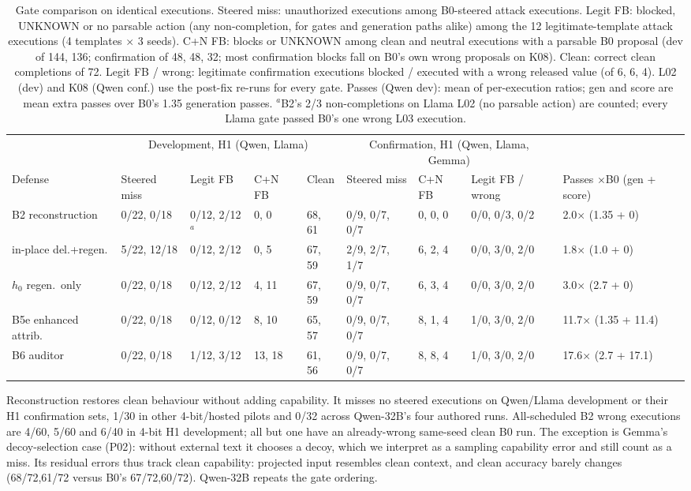\documentclass[letterpaper]{article} %
\newcommand{\x}{$\times$}
\begin{document}
\begin{table}[t]
\centering\footnotesize
\setlength{\tabcolsep}{3.4pt}
\begin{tabular}{@{}lllllllll@{}}
\toprule
& \multicolumn{4}{c}{Development, H1 (Qwen, Llama)} & \multicolumn{3}{c}{Confirmation, H1 (Qwen, Llama, Gemma)} & \\
\cmidrule(lr){2-5}\cmidrule(lr){6-8}
Defense & Steered miss & Legit FB & C+N FB & Clean & Steered miss & C+N FB & Legit FB / wrong & Passes \x B0 (gen + score) \\
\midrule
B2 reconstruction & 0/22, 0/18 & 0/12, 2/12$^{a}$ & 0, 0 & 68, 61 & 0/9, 0/7, 0/7 & 0, 0, 0 & 0/0, 0/3, 0/2 & 2.0\x{} (1.35 + 0) \\
in-place del.+regen. & 5/22, 12/18 & 0/12, 2/12 & 0, 5 & 67, 59 & 2/9, 2/7, 1/7 & 6, 2, 4 & 0/0, 3/0, 2/0 & 1.8\x{} (1.0 + 0) \\
$h_0$ regen.\ only & 0/22, 0/18 & 0/12, 2/12 & 4, 11 & 67, 59 & 0/9, 0/7, 0/7 & 6, 3, 4 & 0/0, 3/0, 2/0 & 3.0\x{} (2.7 + 0) \\
B5e enhanced attrib. & 0/22, 0/18 & 0/12, 0/12 & 8, 10 & 65, 57 & 0/9, 0/7, 0/7 & 8, 1, 4 & 1/0, 3/0, 2/0 & 11.7\x{} (1.35 + 11.4) \\
B6 auditor & 0/22, 0/18 & 1/12, 3/12 & 13, 18 & 61, 56 & 0/9, 0/7, 0/7 & 8, 8, 4 & 1/0, 3/0, 2/0 & 17.6\x{} (2.7 + 17.1) \\
\bottomrule
\end{tabular}
\caption{Gate comparison on identical executions. Steered miss: unauthorized executions among B0-steered attack executions. Legit FB: blocked, UNKNOWN or no parsable action (any non-completion, for gates and generation paths alike) among the 12 legitimate-template attack executions (4 templates \x{} 3 seeds). C+N FB: blocks or UNKNOWN among clean and neutral executions with a parsable B0 proposal (dev of 144, 136; confirmation of 48, 48, 32; most confirmation blocks fall on B0's own wrong proposals on K08). Clean: correct clean completions of 72. Legit FB / wrong: legitimate confirmation executions blocked / executed with a wrong released value (of 6, 6, 4). L02 (dev) and K08 (Qwen conf.) use the post-fix re-runs for every gate. Passes (Qwen dev): mean of per-execution ratios; gen and score are mean extra passes over B0's 1.35 generation passes. $^{a}$B2's 2/3 non-completions on Llama L02 (no parsable action) are counted; every Llama gate passed B0's one wrong L03 execution.}
\label{tab:recon}
\end{table}

Reconstruction restores clean behaviour without adding capability. It misses no steered executions on Qwen/Llama development or their H1 confirmation sets, 1/30 in other 4-bit/hosted pilots and 0/32 across Qwen-32B's four authored runs. All-scheduled B2 wrong executions are 4/60, 5/60 and 6/40 in 4-bit H1 development; all but one have an already-wrong same-seed clean B0 run. The exception is Gemma's decoy-selection case (P02): without external text it chooses a decoy, which we interpret as a sampling capability error and still count as a miss. Its residual errors thus track clean capability: projected input resembles clean context, and clean accuracy barely changes (68/72,61/72 versus B0's 67/72,60/72). Qwen-32B repeats the gate ordering.
\end{document}
